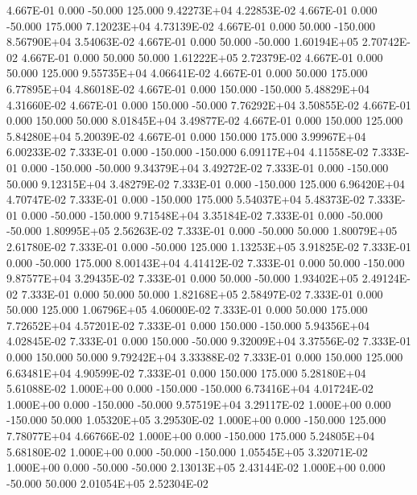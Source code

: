   4.667E-01     0.000   -50.000   125.000 9.42273E+04 4.22853E-02
  4.667E-01     0.000   -50.000   175.000 7.12023E+04 4.73139E-02
  4.667E-01     0.000    50.000  -150.000 8.56790E+04 3.54063E-02
  4.667E-01     0.000    50.000   -50.000 1.60194E+05 2.70742E-02
  4.667E-01     0.000    50.000    50.000 1.61222E+05 2.72379E-02
  4.667E-01     0.000    50.000   125.000 9.55735E+04 4.06641E-02
  4.667E-01     0.000    50.000   175.000 6.77895E+04 4.86018E-02
  4.667E-01     0.000   150.000  -150.000 5.48829E+04 4.31660E-02
  4.667E-01     0.000   150.000   -50.000 7.76292E+04 3.50855E-02
  4.667E-01     0.000   150.000    50.000 8.01845E+04 3.49877E-02
  4.667E-01     0.000   150.000   125.000 5.84280E+04 5.20039E-02
  4.667E-01     0.000   150.000   175.000 3.99967E+04 6.00233E-02
  7.333E-01     0.000  -150.000  -150.000 6.09117E+04 4.11558E-02
  7.333E-01     0.000  -150.000   -50.000 9.34379E+04 3.49272E-02
  7.333E-01     0.000  -150.000    50.000 9.12315E+04 3.48279E-02
  7.333E-01     0.000  -150.000   125.000 6.96420E+04 4.70747E-02
  7.333E-01     0.000  -150.000   175.000 5.54037E+04 5.48373E-02
  7.333E-01     0.000   -50.000  -150.000 9.71548E+04 3.35184E-02
  7.333E-01     0.000   -50.000   -50.000 1.80995E+05 2.56263E-02
  7.333E-01     0.000   -50.000    50.000 1.80079E+05 2.61780E-02
  7.333E-01     0.000   -50.000   125.000 1.13253E+05 3.91825E-02
  7.333E-01     0.000   -50.000   175.000 8.00143E+04 4.41412E-02
  7.333E-01     0.000    50.000  -150.000 9.87577E+04 3.29435E-02
  7.333E-01     0.000    50.000   -50.000 1.93402E+05 2.49124E-02
  7.333E-01     0.000    50.000    50.000 1.82168E+05 2.58497E-02
  7.333E-01     0.000    50.000   125.000 1.06796E+05 4.06000E-02
  7.333E-01     0.000    50.000   175.000 7.72652E+04 4.57201E-02
  7.333E-01     0.000   150.000  -150.000 5.94356E+04 4.02845E-02
  7.333E-01     0.000   150.000   -50.000 9.32009E+04 3.37556E-02
  7.333E-01     0.000   150.000    50.000 9.79242E+04 3.33388E-02
  7.333E-01     0.000   150.000   125.000 6.63481E+04 4.90599E-02
  7.333E-01     0.000   150.000   175.000 5.28180E+04 5.61088E-02
  1.000E+00     0.000  -150.000  -150.000 6.73416E+04 4.01724E-02
  1.000E+00     0.000  -150.000   -50.000 9.57519E+04 3.29117E-02
  1.000E+00     0.000  -150.000    50.000 1.05320E+05 3.29530E-02
  1.000E+00     0.000  -150.000   125.000 7.78077E+04 4.66766E-02
  1.000E+00     0.000  -150.000   175.000 5.24805E+04 5.68180E-02
  1.000E+00     0.000   -50.000  -150.000 1.05545E+05 3.32071E-02
  1.000E+00     0.000   -50.000   -50.000 2.13013E+05 2.43144E-02
  1.000E+00     0.000   -50.000    50.000 2.01054E+05 2.52304E-02

